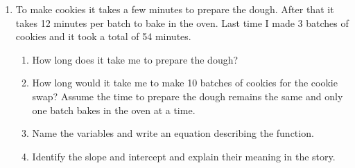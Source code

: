 \begin{enumerate}
\item To make cookies it takes a few minutes to prepare the dough.  After that it takes 12 minutes per batch to bake in the oven.  Last time I made 3 batches of cookies and it took a total of 54 minutes. 
\begin{enumerate}
\item How long does it take me to prepare the dough?
\item How long would it take me to make 10 batches of cookies for the cookie swap?  Assume the time to prepare the dough remains the same and only one batch bakes in the oven at a time.
\item Name the variables and write an equation describing the function.
\item Identify the slope and intercept and explain their meaning in the story.
\end{enumerate}

\end{enumerate}
